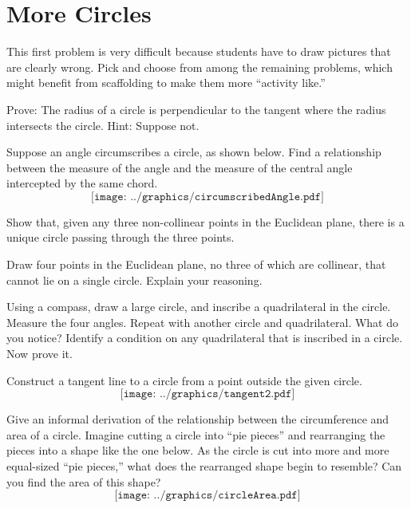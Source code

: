 \newpage

\section{More Circles}

\begin{teachingnote}
This first problem is very difficult because students have to draw pictures that are clearly wrong.  Pick and choose from among the remaining problems, which might benefit from scaffolding to make them more ``activity like.''
\end{teachingnote}

\begin{prob}
Prove: The radius of a circle is perpendicular to the tangent where the radius intersects the circle.  Hint:  Suppose not. 
\end{prob}

\begin{prob}
Suppose an angle circumscribes a circle, as shown below.  Find a relationship between the measure of the angle and the measure of the central angle intercepted by the same chord.
$$\texttt{[image: ../graphics/circumscribedAngle.pdf]}$$
\end{prob}

\begin{prob}
Show that, given any three non-collinear points in the Euclidean
plane, there is a unique circle passing through the three points.
\end{prob}

\begin{prob}
Draw four points in the Euclidean plane, no three of which are collinear, that cannot lie on a single circle.  Explain your reasoning. 
\end{prob}

\begin{prob}
Using a compass, draw a large circle, and inscribe a quadrilateral in the circle.  Measure the four angles.  Repeat with another circle and quadrilateral.  What do you notice?  Identify a condition on any quadrilateral that is inscribed in a circle.  Now prove it.  
\end{prob}

\begin{prob}
Construct a tangent line to a circle from a point outside the given circle.
$$\texttt{[image: ../graphics/tangent2.pdf]}$$
\end{prob}

\begin{prob}
Give an informal derivation of the relationship between the circumference and area of a circle.  Imagine cutting a circle into ``pie pieces'' and rearranging the pieces into a shape like the one below.  As the circle is cut into more and more equal-sized ``pie pieces,'' what does the rearranged shape begin to resemble?  Can you find the area of this shape?  
$$\texttt{[image: ../graphics/circleArea.pdf]}$$
\end{prob}

